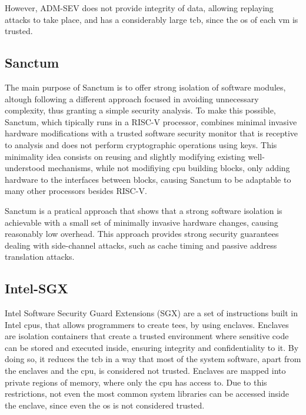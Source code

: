However, ADM-SEV does not provide integrity of data, allowing replaying attacks to take place, and has a considerably large \gls{tcb}, since the \gls{os} of each \gls{vm} is trusted. \cite{amdSEVPaper}

\subsection{Sanctum}
\label{ssec:sanctum}
The main purpose of Sanctum \cite{sanctumPaper} is to offer strong isolation of software modules, altough following a different approach focused in avoiding unnecessary complexity, thus granting a simple security analysis.
To make this possible, Sanctum, which tipically runs in a RISC-V processor, combines minimal invasive hardware modifications with a trusted software security monitor that is receptive to analysis and does not perform cryptographic operations using keys. 
This minimality idea consists on reusing and slightly modifying existing well-understood mechanisms, while not modifiying \gls{cpu} building blocks, only adding hardware to the interfaces between blocks, causing Sanctum to be adaptable to many other processors besides RISC-V. 

Sanctum is a pratical approach that shows that a strong software isolation is achievable with a small set of minimally invasive hardware changes, causing reasonably low overhead. 
This approach provides strong security guarantees dealing with side-channel attacks, such as cache timing and passive address translation attacks.

\subsection{Intel-SGX}
\label{ssec:intelsgx}
Intel Software Security Guard Extensions (SGX) \cite{intelSGX} are a set of instructions built in Intel \gls{cpu}s, that allows programmers to create \gls{tee}s, by using enclaves. Enclaves are isolation containers that create a trusted environment where sensitive code can be stored and executed inside, ensuring integrity and confidentiality to it. By doing so, it reduces the \gls{tcb} in a way that most of the system software, apart from the enclaves and the \gls{cpu}, is considered not trusted.
Enclaves are mapped into private regions of memory, where only the \gls{cpu} has access to. Due to this restrictions, not even the most common system libraries can be accessed inside the enclave, since even the \gls{os} is not considered trusted. 

